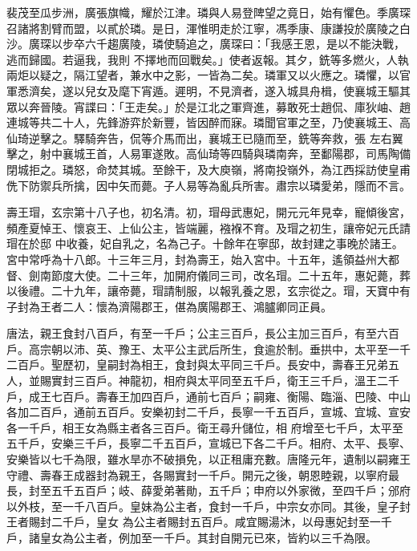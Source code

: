 \begin{pinyinscope}
 裴茂至瓜步洲，廣張旗幟，耀於江津。璘與人易登陴望之竟日，始有懼色。季廣琛召諸將割臂而盟，以貳於璘。是日，渾惟明走於江寧，馮季康、康謙投於廣陵之白沙。廣琛以步卒六千趨廣陵，璘使騎追之，廣琛曰：「我感王恩，是以不能決戰，逃而歸國。若逼我，我則
 不擇地而回戰矣。」使者返報。其夕，銑等多燃火，人執兩炬以疑之，隔江望者，兼水中之影，一皆為二矣。璘軍又以火應之。璘懼，以官軍悉濟矣，遂以兒女及麾下宵遁。遲明，不見濟者，遂入城具舟楫，使襄城王驅其眾以奔晉陵。宵諜曰：「王走矣。」於是江北之軍齊進，募敢死士趙侃、庫狄岫、趙連城等共二十人，先鋒游弈於新豐，皆因醉而寐。璘聞官軍之至，乃使襄城王、高仙琦逆擊之。驛騎奔告，侃等介馬而出，襄城王已隨而至，銑等奔救，張
 左右翼擊之，射中襄城王首，人易軍遂敗。高仙琦等四騎與璘南奔，至鄱陽郡，司馬陶備閉城拒之。璘怒，命焚其城。至餘干，及大庾嶺，將南投嶺外，為江西採訪使皇甫侁下防禦兵所擒，因中矢而薨。子人易等為亂兵所害。肅宗以璘愛弟，隱而不言。



 壽王瑁，玄宗第十八子也，初名清。初，瑁母武惠妃，開元元年見幸，寵傾後宮，頻產夏悼王、懷哀王、上仙公主，皆端麗，襁褓不育。及瑁之初生，讓帝妃元氏請瑁在於邸
 中收養，妃自乳之，名為己子。十餘年在寧邸，故封建之事晚於諸王。宮中常呼為十八郎。十三年三月，封為壽王，始入宮中。十五年，遙領益州大都督、劍南節度大使。二十三年，加開府儀同三司，改名瑁。二十五年，惠妃薨，葬以後禮。二十九年，讓帝薨，瑁請制服，以報乳養之恩，玄宗從之。瑁，天寶中有子封為王者二人：懷為濟陽郡王，偡為廣陽郡王、鴻臚卿同正員。



 唐法，親王食封八百戶，有至一千戶；公主三百戶，長公主加三百戶，有至六百
 戶。高宗朝以沛、英、豫王、太平公主武后所生，食逾於制。垂拱中，太平至一千二百戶。聖歷初，皇嗣封為相王，食封與太平同三千戶。長安中，壽春王兄弟五人，並賜實封三百戶。神龍初，相府與太平同至五千戶，衛王三千戶，溫王二千戶，成王七百戶。壽春王加四百戶，通前七百戶；嗣雍、衡陽、臨淄、巴陵、中山各加二百戶，通前五百戶。安樂初封二千戶，長寧一千五百戶，宣城、宜城、宣安各一千戶，相王女為縣主者各三百戶。衛王尋升儲位，相
 府增至七千戶，太平至五千戶，安樂三千戶，長寧二千五百戶，宣城已下各二千戶。相府、太平、長寧、安樂皆以七千為限，雖水旱亦不破損免，以正租庸充數。唐隆元年，遺制以嗣雍王守禮、壽春王成器封為親王，各賜實封一千戶。開元之後，朝恩睦親，以寧府最長，封至五千五百戶；岐、薛愛弟著勛，五千戶；申府以外家微，至四千戶；邠府以外枝，至一千八百戶。皇妹為公主者，食封一千戶，中宗女亦同。其後，皇子封王者賜封二千戶，皇女
 為公主者賜封五百戶。咸宜賜湯沐，以母惠妃封至一千戶，諸皇女為公主者，例加至一千戶。其封自開元已來，皆約以三千為限。




\end{pinyinscope}
